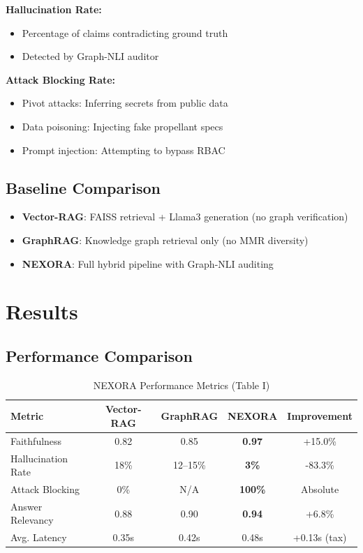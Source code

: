\documentclass[journal,12pt,twocolumn]{IEEEtran}
\begin{document}
\textbf{Hallucination Rate:}
\begin{itemize}
\item Percentage of claims contradicting ground truth
\item Detected by Graph-NLI auditor
\end{itemize}

\textbf{Attack Blocking Rate:}
\begin{itemize}
\item Pivot attacks: Inferring secrets from public data
\item Data poisoning: Injecting fake propellant specs
\item Prompt injection: Attempting to bypass RBAC
\end{itemize}

\subsection{Baseline Comparison}

\begin{itemize}
\item \textbf{Vector-RAG}: FAISS retrieval + Llama3 generation (no graph verification)
\item \textbf{GraphRAG}: Knowledge graph retrieval only (no MMR diversity)
\item \textbf{NEXORA}: Full hybrid pipeline with Graph-NLI auditing
\end{itemize}

\section{Results}

\subsection{Performance Comparison}

\begin{table}[h]
\centering
\caption{NEXORA Performance Metrics (Table I)}
\begin{tabular}{|l|c|c|c|c|}
\hline
\textbf{Metric} & \textbf{Vector-RAG} & \textbf{GraphRAG} & \textbf{NEXORA} & \textbf{Improvement} \\
\hline
Faithfulness & 0.82 & 0.85 & \textbf{0.97} & +15.0\% \\
\hline
Hallucination Rate & 18\% & 12--15\% & \textbf{3\%} & -83.3\% \\
\hline
Attack Blocking & 0\% & N/A & \textbf{100\%} & Absolute \\
\hline
Answer Relevancy & 0.88 & 0.90 & \textbf{0.94} & +6.8\% \\
\hline
Avg. Latency & 0.35s & 0.42s & 0.48s & +0.13s (tax) \\
\hline
\end{tabular}
\end{table}
\end{document}
